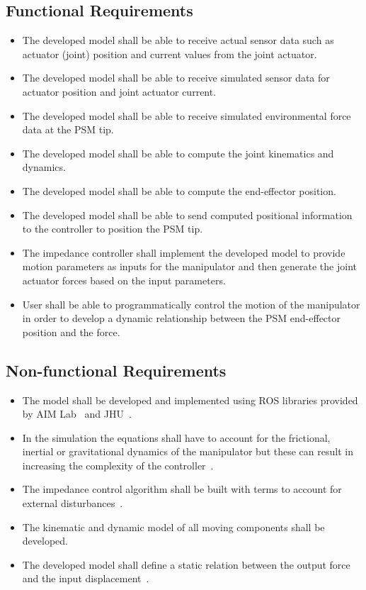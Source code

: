 \documentclass[10pt,journal,compsoc]{IEEEtran}
\begin{document}
\subsection{Functional Requirements}
\begin{itemize}
  \item The developed model shall be able to receive actual sensor data such as actuator (joint) position and current values from the joint actuator.
  \item The developed model shall be able to receive simulated sensor data for actuator position and joint actuator current.
  \item The developed model shall be able to receive simulated environmental force data at the PSM tip.
  \item The developed model shall be able to compute the joint kinematics and dynamics.
  \item The developed model shall be able to compute the end-effector position.
  \item The developed model shall be able to send computed positional information to the controller to position the PSM tip.
  \item The impedance controller shall implement the developed model to provide motion parameters as inputs for the manipulator and then generate the joint actuator forces based on the input parameters.
  \item User shall be able to programmatically control the motion of the manipulator in order to develop a dynamic relationship between the PSM end-effector position and the force.
\end{itemize}

\subsection{Non-functional Requirements}
\begin{itemize}
  \item The model shall be developed and implemented using ROS libraries provided by AIM Lab~\cite{aimlab} and JHU~\cite{dvrkjhu}.
  \item In the simulation the equations shall have to account for the frictional, inertial or gravitational dynamics of the manipulator but these can result in increasing the complexity of the controller~\cite{hogan1984}.
  \item The impedance control algorithm shall be built with terms to account for external disturbances~\cite{hogan1984}.
  \item The kinematic and dynamic model of all moving components shall be developed.
  \item The developed model shall define a static relation between the output force and the input displacement~\cite{hogan1984}.
\end{itemize}
\end{document}
